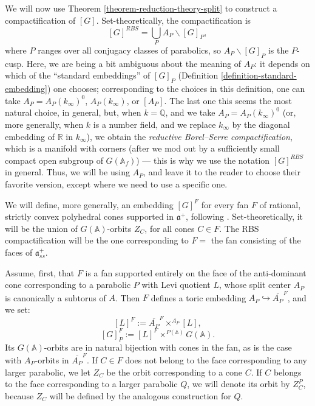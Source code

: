 We will now use Theorem \ref{theorem-reduction-theory-split} to construct a compactification of $[G]$. Set-theoretically, the compactification is
$$ {[G]}^{RBS} = \bigcup_P A_P\backslash [G]_P,$$
where $P$ ranges over all conjugacy classes of parabolics, so $A_P\backslash [G]_P$ is the $P$-cusp. Here, we are being a bit ambiguous about the meaning of $A_P$: it depends on which of the ``standard embeddings''  of $[G]_P$ (Definition \ref{definition-standard-embedding}) one chooses; corresponding to the choices in this definition, one can take $A_P = A_P(k_\infty)^0$, $A_P(k_\infty)$, or $[A_P]$. The last one this seems the most natural choice, in general, but, when $k = \mathbb Q$, and we take $A_P = A_P(k_\infty)^0$ (or, more generally, when $k$ is a number field, and we replace $k_\infty$ by the diagonal embedding of $\mathbb R$ in $k_\infty$), we obtain the \emph{reductive Borel--Serre compactification}, which is a manifold with corners (after we mod out by a sufficiently small compact open subgroup of $G(\mathbb A_f)$) --- this is why we use the notation ${[G]}^{RBS}$ in general. Thus, we will be using $A_P$, and leave it to the reader to choose their favorite version, except where we need to use a specific one.


We will define, more generally, an embedding $[G]^F$ for every fan $F$ of rational, strictly convex polyhedral cones supported in $\mathfrak a^+$, following \cite{Sakellaridis-stacks}. Set-theoretically, it will be the union of $G(\mathbb A)$-orbits $Z_C$, for all cones $C\in F$. The RBS compactification will be the one corresponding to $F=$ the fan consisting of the faces of $\mathfrak a^+_{ss}$. 

Assume, first, that $F$ is a fan supported entirely on the face of the anti-dominant cone corresponding to a parabolic $P$ with Levi quotient $L$, whose split center $A_P$ is canonically a subtorus of $A$. Then $F$ defines a toric embedding $A_P\hookrightarrow \overline{A_P}^F$, and we set:
\begin{equation}
\label{equation-LF} 
[L]^{F}:= \overline{A_P}^F\times^{A_P} [L],
\end{equation}
\begin{equation}
\label{equation-GF} 
[G]_P^{F}:= [L]^{F} \times^{P(\mathbb A)} G(\mathbb A).
\end{equation}
Its $G(\mathbb A)$-orbits are in natural bijection with cones in the fan, as is the case with $A_P$-orbits in $\overline{A_P}^F$. If $C\in F$ does not belong to the face corresponding to any larger parabolic,  we let $Z_C$ be the orbit corresponding to a cone $C$. If $C$ belongs to the face corresponding to a larger parabolic $Q$, we will denote its orbit by $Z_C^P$, because $Z_C$ will be defined by the analogous construction for $Q$.

